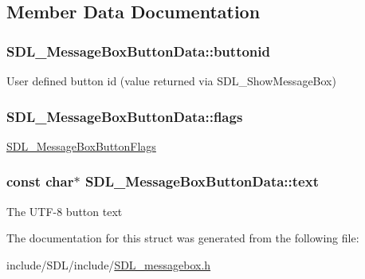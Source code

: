 \subsection{Member Data Documentation}
\hypertarget{struct_s_d_l___message_box_button_data_a22938886a6b13792006cc5c91fa38e92}{
\subsubsection[{buttonid}]{ S\-D\-L\-\_\-\-Message\-Box\-Button\-Data\-::buttonid}}\label{struct_s_d_l___message_box_button_data_a22938886a6b13792006cc5c91fa38e92}
User defined button id (value returned via S\-D\-L\-\_\-\-Show\-Message\-Box) \hypertarget{struct_s_d_l___message_box_button_data_a426c8b5da0e718242c7840706d95de0b}{
\subsubsection[{flags}]{ S\-D\-L\-\_\-\-Message\-Box\-Button\-Data\-::flags}}\label{struct_s_d_l___message_box_button_data_a426c8b5da0e718242c7840706d95de0b}
\hyperlink{_s_d_l__messagebox_8h_ad21beffe204426be6efbf4990c916ad0}{S\-D\-L\-\_\-\-Message\-Box\-Button\-Flags} \hypertarget{struct_s_d_l___message_box_button_data_af35f3062f0577159284c8828caaf08e4}{
\subsubsection[{text}]{\setlength{\rightskip}{0pt plus 5cm}const char$\ast$ S\-D\-L\-\_\-\-Message\-Box\-Button\-Data\-::text}}\label{struct_s_d_l___message_box_button_data_af35f3062f0577159284c8828caaf08e4}
The U\-T\-F-\/8 button text 

The documentation for this struct was generated from the following file\-:\begin{DoxyCompactItemize}
\item 
include/\-S\-D\-L/include/\hyperlink{_s_d_l__messagebox_8h}{S\-D\-L\-\_\-messagebox.\-h}\end{DoxyCompactItemize}
